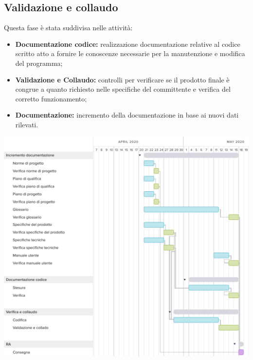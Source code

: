 \subsection{Validazione e collaudo}
Questa fase è stata suddivisa nelle attività:
\begin{itemize}
	\item \textbf{Documentazione codice:} realizzazione documentazione relative al codice scritto atto a fornire le conoscenze necessarie per la manutenzione e modifica del programma;
	\item \textbf{Validazione e Collaudo:} controlli per verificare se il prodotto finale è congrue a quanto richiesto nelle specifiche del committente e verifica del corretto funzionamento;
	\item \textbf{Documentazione:} incremento della documentazione in base ai nuovi dati rilevati.
\end{itemize}
\includegraphics[width=\textwidth]{res/img/g5}